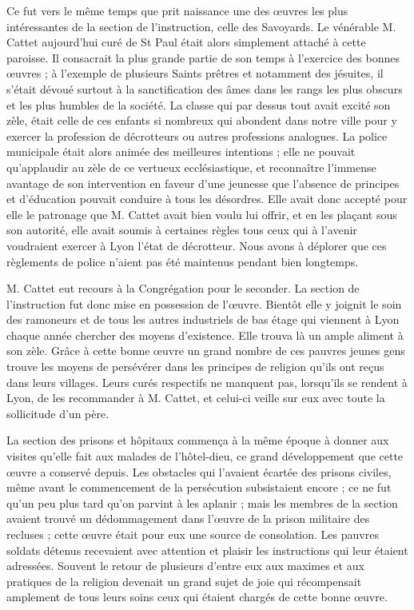 Ce fut vers le même temps que prit naissance une des œuvres les plus intéressantes de la section de l'instruction, celle des Savoyards. Le vénérable M. Cattet aujourd'hui curé de St Paul était alors simplement attaché à cette paroisse. Il consacrait la plus grande partie de son temps à l'exercice des bonnes œuvres ; à l'exemple de plusieurs Saints prêtres et notamment des jésuites, il s'était dévoué surtout à la sanctification des âmes dans les rangs les plus obscurs et les plus humbles de la société. La classe qui par dessus tout avait excité son zèle, était celle de ces enfants si nombreux qui abondent dans notre ville pour y exercer la profession de décrotteurs ou autres professions analogues. La police municipale était alors animée des meilleures intentions ; elle ne pouvait qu'applaudir au zèle de ce vertueux ecclésiastique, et reconnaître l'immense avantage de son intervention en faveur d'une jeunesse que l'absence de principes et d'éducation pouvait conduire à tous les désordres. Elle avait donc accepté pour elle le patronage que M. Cattet avait bien voulu lui offrir, et en les plaçant sous son autorité, elle avait soumis à certaines règles tous ceux qui à l'avenir voudraient exercer à Lyon l’état de décrotteur. Nous avons à déplorer que ces règlements de police n'aient pas été maintenus pendant bien longtemps.

M. Cattet eut recours à la Congrégation pour le seconder. La section de l'instruction fut donc mise en possession de l'œuvre. Bientôt elle y joignit le soin des ramoneurs et de
tous les autres industriels de bas étage qui viennent à Lyon chaque année chercher des moyens d'existence. Elle trouva là un ample aliment à son zèle. Grâce à cette bonne œuvre un grand nombre de ces pauvres jeunes gens trouve les moyens de persévérer dans les principes de religion qu'ils ont reçus dans leurs villages. Leurs curés respectifs ne manquent pas, lorsqu'ils se rendent à Lyon, de les recommander à M. Cattet, et celui-ci veille sur eux avec toute la sollicitude d'un père.

La section des prisons et hôpitaux commença à la même époque à donner aux visites qu'elle fait aux malades de l'hôtel-dieu, ce grand développement que cette œuvre a conservé depuis. Les obstacles qui l'avaient écartée des prisons civiles, même avant le commencement de la persécution subsistaient encore ; ce ne fut qu'un peu plus tard qu'on parvint à les aplanir ; mais les membres de la section avaient trouvé un dédommagement dans l'œuvre de la prison militaire des recluses ; cette œuvre était pour eux une source de consolation. Les pauvres soldats détenus recevaient avec attention et plaisir les instructions qui leur étaient adressées. Souvent le retour de plusieurs d'entre eux aux maximes et aux pratiques de la religion devenait un grand sujet de joie qui récompensait amplement de tous leurs soins ceux qui étaient chargés de cette bonne œuvre.

